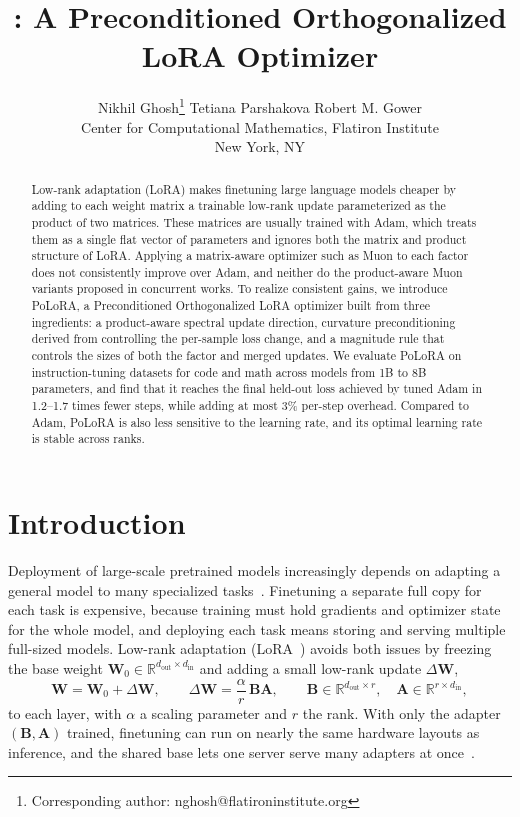 \documentclass{article}
\title{\methodname: A Preconditioned Orthogonalized LoRA Optimizer}
\author{
Nikhil Ghosh\footnote{Corresponding author: nghosh@flatironinstitute.org} \hspace{1cm}
Tetiana Parshakova \hspace{1cm}
Robert M. Gower\\[0.5em]
Center for Computational Mathematics, Flatiron Institute\\
New York, NY
}
\date{}
\newcommand{\mat}[1]{\bm{#1}}
\newcommand{\R}{\mathbb{R}}
\newcommand{\DW}{\Delta\mat{W}}
\begin{document}
\maketitle

\begin{abstract}
Low-rank adaptation (LoRA) makes finetuning large language models cheaper by adding to each weight matrix a trainable low-rank update parameterized as the product of two matrices. These matrices are usually trained with Adam, which treats them as a single flat vector of parameters and ignores both the matrix and product structure of LoRA. Applying a matrix-aware optimizer such as Muon to each factor does not consistently improve over Adam, and neither do the product-aware Muon variants proposed in concurrent works. To realize consistent gains, we introduce PoLoRA, a Preconditioned Orthogonalized LoRA optimizer built from three ingredients: a product-aware spectral update direction, curvature preconditioning derived from controlling the per-sample loss change, and a magnitude rule that controls the sizes of both the factor and merged updates. We evaluate PoLoRA on instruction-tuning datasets for code and math across models from 1B to 8B parameters, and find that it reaches the final held-out loss achieved by tuned Adam in 1.2--1.7 times fewer steps, while adding at most 3\% per-step overhead. Compared to Adam, PoLoRA is also less sensitive to the learning rate, and its optimal learning rate is stable across ranks.
\end{abstract}

\section{Introduction}
\label{sec:intro}

Deployment of large-scale pretrained models increasingly depends on adapting a
general model to many specialized tasks~\cite{foundation_models}. Finetuning a separate full copy for each task is expensive, because training must hold gradients and optimizer state for the whole model, and deploying each task means storing and serving multiple full-sized models. Low-rank adaptation (LoRA~\cite{lora}) avoids both issues by freezing the base weight $\mat{W}_0 \in \R^{d_{\mathrm{out}} \times d_{\mathrm{in}}}$ and adding a small low-rank update $\Delta\mat{W}$,
\begin{equation}
\mat{W} = \mat{W}_0 + \DW, \qquad \DW = \frac{\alpha}{r}\,\mat{B}\mat{A}, \qquad
\mat{B} \in \mathbb{R}^{d_{\mathrm{out}} \times r}, \quad
\mat{A} \in \mathbb{R}^{r \times d_{\mathrm{in}}},
\label{eq:lora}
\end{equation}
to each layer, with $\alpha$ a scaling parameter and $r$ the rank. With only the adapter $(\mat{B}, \mat{A})$ trained, finetuning can run on nearly the same hardware layouts as inference, and the shared base lets one server serve many adapters at once~\cite{punica,bitdelta,schulman2025lora}.
\end{document}
